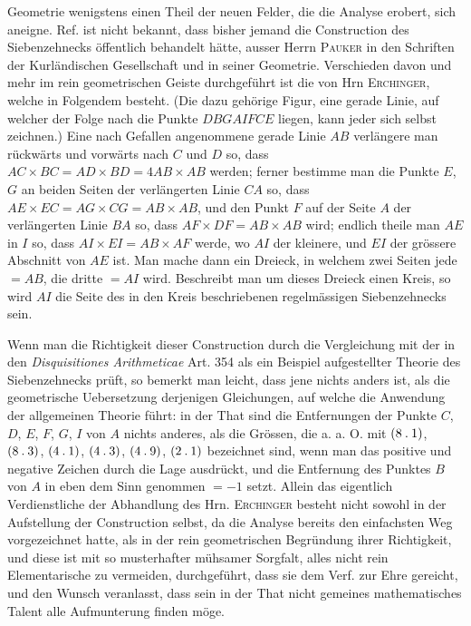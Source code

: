 %
Geometrie wenigstens einen Theil der neuen Felder, die die Analyse erobert, sich aneigne. Ref. ist nicht bekannt, dass bisher jemand die Construction des Siebenzehnecks öffentlich behandelt hätte, ausser Herrn \textsc{Pauker} in den Schriften der Kurländischen Gesellschaft und in seiner Geometrie. Verschieden davon und mehr im rein geometrischen Geiste durchgeführt ist die von Hrn \textsc{Erchinger}, welche in Folgendem besteht. (Die dazu gehörige Figur, eine gerade Linie, auf welcher der Folge nach die Punkte $DBGAIFCE$ liegen, kann jeder sich selbst zeichnen.) Eine nach Gefallen angenommene gerade Linie $AB$ verlängere man rückwärts und vorwärts nach $C$ und $D$ so, dass $AC\times BC=AD\times BD=4AB\times AB$ werden; ferner bestimme man die Punkte $E$, $G$ an beiden Seiten der verlängerten Linie $CA$ so, dass $AE\times EC=AG\times CG=AB\times AB$, und den Punkt $F$ auf der Seite $A$ der verlängerten Linie $BA$ so, dass $AF\times DF=AB\times AB$ wird; endlich theile man $AE$ in $I$ so, dass $AI\times EI=AB\times AF$ werde, wo $AI$ der kleinere, und $EI$ der grössere Abschnitt von $AE$ ist. Man mache dann ein Dreieck, in welchem zwei Seiten jede $=AB$, die dritte $=AI$ wird. Beschreibt man um dieses Dreieck einen Kreis, so wird $AI$ die Seite des in den Kreis beschriebenen regelmässigen Siebenzehnecks sein.

Wenn man die Richtigkeit dieser Construction durch die Vergleichung mit der in den \emph{Disquisitiones Arithmeticae} Art. 354 als ein Beispiel aufgestellter Theorie des Siebenzehnecks prüft, so bemerkt man leicht, dass jene nichts anders ist, als die geometrische Uebersetzung derjenigen Gleichungen, auf welche die Anwendung der allgemeinen Theorie führt: in der That sind die Entfernungen der Punkte $C$, $D$, $E$, $F$, $G$, $I$ von $A$ nichts anderes, als die Grössen, die a. a. O. mit $(8\mathbin{.}1)$, $(8\mathbin{.}3)$, $(4\mathbin{.}1)$, $(4\mathbin{.}3)$, $(4\mathbin{.}9)$, $(2\mathbin{.}1)$ bezeichnet sind, wenn man das positive und negative Zeichen durch die Lage ausdrückt, und die Entfernung des Punktes $B$ von $A$ in eben dem Sinn genommen $=-1$ setzt. Allein das eigentlich Verdienstliche der Abhandlung des Hrn. \textsc{Erchinger} besteht nicht sowohl in der Aufstellung der Construction selbst, da die Analyse bereits den einfachsten Weg vorgezeichnet hatte, als in der rein geometrischen Begründung ihrer Richtigkeit, und diese ist mit so musterhafter mühsamer Sorgfalt, alles nicht rein Elementarische zu vermeiden, durchgeführt, dass sie dem Verf. zur Ehre gereicht, und den Wunsch veranlasst, dass sein in der That nicht gemeines mathematisches Talent alle Aufmunterung finden möge.

